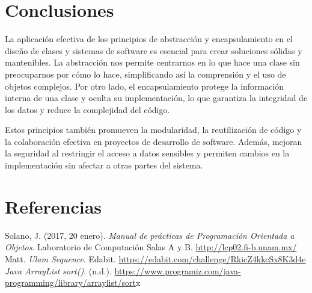 \documentclass[11pt, twocolumn]{article}
\begin{document}
  \section*{Conclusiones}
  La aplicación efectiva de los principios de abstracción y encapsulamiento en el diseño de clases y sistemas de software es esencial para crear soluciones sólidas y mantenibles. La abstracción nos permite centrarnos en lo que hace una clase sin preocuparnos por cómo lo hace, simplificando así la comprensión y el uso de objetos complejos. Por otro lado, el encapsulamiento protege la información interna de una clase y oculta su implementación, lo que garantiza la integridad de los datos y reduce la complejidad del código.

  Estos principios también promueven la modularidad, la reutilización de código y la colaboración efectiva en proyectos de desarrollo de software. Además, mejoran la seguridad al restringir el acceso a datos sensibles y permiten cambios en la implementación sin afectar a otras partes del sistema.


  \section*{Referencias}
  \small
  Solano, J. (2017, 20 enero). \textit{Manual de prácticas de Programación Orientada a Objetos}. Laboratorio de Computación Salas A y B. \url{http://lcp02.fi-b.unam.mx/} \\

  Matt. \textit{Ulam Sequence}. Edabit. \url{https://edabit.com/challenge/RkicZ4kkcSx8K3d4e} \\

  \textit{Java ArrayList sort()}. (n.d.). \url{https://www.programiz.com/java-programming/library/arraylist/sort}x
\end{document}
